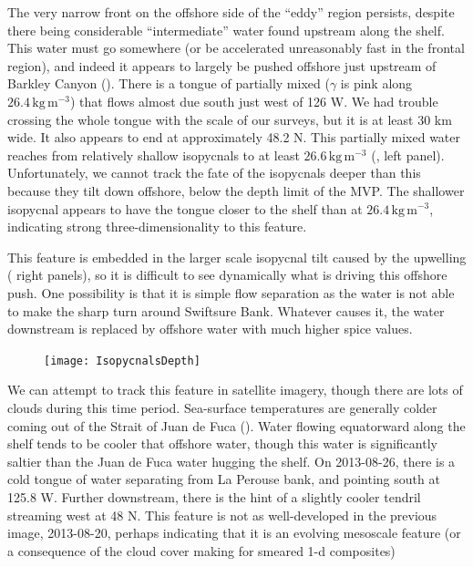 \documentclass[draft]{agujournal2019}
\begin{document}
The very narrow front on the offshore side of the ``eddy'' region persists, despite there being considerable ``intermediate'' water found upstream along the shelf.  This water must go somewhere (or be accelerated unreasonably fast in the frontal region), and indeed it appears to largely be pushed offshore just upstream of Barkley Canyon ().  There is a tongue of partially mixed ($\gamma$ is pink along $26.4\,\mathrm{kg\,m^{-3}}$) that flows almost due south just west of 126 W. We had trouble crossing the whole tongue with the scale of our surveys, but it is at least 30 km wide. It also appears to end at approximately 48.2 N.  This partially mixed water reaches from relatively shallow isopycnals to at least $26.6\,\mathrm{kg\,m^{-3}}$ (, left panel).  Unfortunately, we cannot track the fate of the isopycnals deeper than this because they tilt down offshore, below the depth limit of the MVP.   The shallower isopycnal appears to have the tongue closer to the shelf than at $26.4\,\mathrm{kg\,m^{-3}}$, indicating strong three-dimensionality to this feature.

This feature is embedded in the larger scale isopycnal tilt caused by the upwelling ( right panels), so it is difficult to see dynamically what is driving this offshore push.  One possibility is that it is simple flow separation as the water is not able to make the sharp turn around Swiftsure Bank.  Whatever causes it, the water downstream is replaced by offshore water with much higher spice values.


\begin{figure}[htbp]
  \begin{center}
    \texttt{[image: IsopycnalsDepth]}
    \caption{
      \label{fig:IsopycnalsDepth} }
  \end{center}
\end{figure}

We can attempt to track this feature in satellite imagery, though there are lots of clouds during this time period.  Sea-surface temperatures are generally colder coming out of the Strait of Juan de Fuca ().  Water flowing equatorward along the shelf tends to be cooler that offshore water, though this water is significantly saltier than the Juan de Fuca water hugging the shelf. On 2013-08-26, there is a cold tongue of water separating from La Perouse bank, and pointing south at 125.8 W.  Further downstream, there is the hint of a slightly cooler tendril streaming west at 48 N.  This feature is not as well-developed in the previous image, 2013-08-20, perhaps indicating that it is an evolving mesoscale feature (or a consequence of the cloud cover making for smeared 1-d composites)
\end{document}
